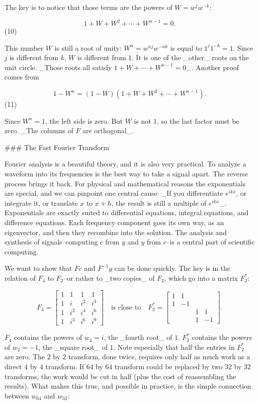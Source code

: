 The key is to notice that those terms are the powers of \(W=w^{j}w^{-k}\):

\[1+W+W^{2}+\cdots+W^{n-1}=0.\] (10)

This number \(W\) is still a root of unity: \(W^{n}=w^{nj}w^{-nk}\) is equal to \(1^{j}1^{-k}=1\). Since \(j\) is different from \(k\), \(W\) is different from \(1\). It is one of the _other_ roots on the unit circle. _Those roots all satisfy \(1+W+\cdots+W^{n-1}=0\)_. Another proof comes from

\[1-W^{n}=(1-W)(1+W+W^{2}+\cdots+W^{n-1}).\] (11)

Since \(W^{n}=1\), the left side is zero. But \(W\) is not \(1\), so the last factor must be zero. _The columns of \(F\) are orthogonal_.

### The Fast Fourier Transform

Fourier analysis is a beautiful theory, and it is also very practical. To analyze a waveform into its frequencies is the best way to take a signal apart. The reverse process brings it back. For physical and mathematical reasons the exponentials are special, and we can pinpoint one central cause: _If you differentiate \(e^{ikx}\), or integrate it, or translate \(x\) to \(x+h\), the result is still a multiple of \(e^{ikx}\)_. Exponentials are exactly suited to differential equations, integral equations, and difference equations. Each frequency component goes its own way, as an eigenvector, and then they recombine into the solution. The analysis and synthesis of signals--computing \(c\) from \(y\) and \(y\) from \(c\)--is a central part of scientific computing.

We want to show that \(Fc\) and \(F^{-1}y\) can be done quickly. The key is in the relation of \(F_{4}\) to \(F_{2}\)--or rather to _two copies_ of \(F_{2}\), which go into a matrix \(F_{2}^{*}\):

\[F_{4}=\begin{bmatrix}1&1&1&1\\ 1&i&i^{2}&i^{3}\\ 1&i^{2}&i^{4}&i^{6}\\ 1&i^{3}&i^{6}&i^{9}\end{bmatrix}\quad\text{is close to}\quad F_{2}^{*}= \begin{bmatrix}1&1&&\\ 1&-1&&\\ &&1&1\\ &&1&-1\end{bmatrix}.\]

\(F_{4}\) contains the powers of \(w_{4}=i\), the _fourth root_ of \(1\). \(F_{2}^{*}\) contains the powers of \(w_{2}=-1\), the _square root_ of \(1\). Note especially that half the entries in \(F_{2}^{*}\) are zero. The \(2\) by \(2\) transform, done twice, requires only half as much work as a direct \(4\) by \(4\) transform. If \(64\) by \(64\) transform could be replaced by two \(32\) by \(32\) transforms, the work would be cut in half (plus the cost of reassembling the results). What makes this true, and possible in practice, is the simple connection between \(w_{64}\) and \(w_{32}\):


